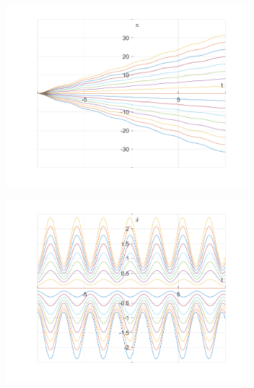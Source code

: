 \documentclass{article}
\begin{document}
	\begin{figure}[h!]
		\centering
		\begin{subfigure}[b]{0.48\linewidth}
			\includegraphics[width=\linewidth]{./SmallOscillations/S11/F3.png}
		\end{subfigure}
		\begin{subfigure}[b]{0.48\linewidth}
			\includegraphics[width=\linewidth]{./SmallOscillations/S11/F4.png}
		\end{subfigure}
	\end{figure}
\end{document}
